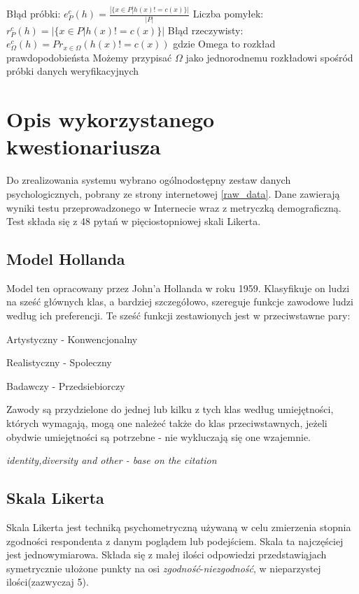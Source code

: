 \documentclass[12pt,a4paper,oneside]{report} %
\begin{document}
Błąd próbki:
$    e_P^c(h) = \frac{| \{ x \in P | h(x) != c(x) \} |}{|P|} $
Liczba pomyłek:
$        r_P^c(h) = | \{ x \in P | h(x) != c(x) \} | $
Błąd rzeczywisty:
$    e_\Omega^c (h) = Pr_{x \in \Omega}(h(x) != c(x))$ gdzie Omega to rozkład prawdopodobieństa
Możemy przypisać $\Omega$ jako jednorodnemu rozkładowi spośród próbki danych weryfikacyjnych
            
            





\chapter{Opis wykorzystanego kwestionariusza}

Do zrealizowania systemu wybrano ogólnodostępny zestaw danych psychologicznych, pobrany ze strony internetowej \ref{raw_data}. Dane zawierają wyniki testu przeprowadzonego w Internecie wraz z metryczką demograficzną. Test składa się z 48 pytań w pięciostopniowej skali Likerta.

\section{Model Hollanda}

Model ten opracowany przez John'a Hollanda w roku 1959. \cite{holland-source} Klasyfikuje on ludzi na sześć głównych klas, a bardziej szczegółowo, szereguje funkcje zawodowe ludzi według ich preferencji. Te sześć funkcji zestawionych jest w przeciwstawne pary:\par
Artystyczny - Konwencjonalny\par
Realistyczny - Spoleczny\par
Badawczy - Przedsiebiorczy\par
Zawody są przydzielone do jednej lub kilku z tych klas według umiejętności, których wymagają, mogą one należeć także do klas przeciwstawnych, jeżeli obydwie umiejętności są potrzebne - nie wykluczają się one wzajemnie.\par

\emph{identity,diversity and other - base on the citation}

\section{Skala Likerta}

Skala Likerta jest techniką psychometryczną używaną w celu zmierzenia stopnia zgodności respondenta z danym poglądem lub podejściem. Skala ta najczęściej jest jednowymiarowa. Składa się z małej ilości odpowiedzi przedstawiąjach symetrycznie ułożone punkty na osi \emph{zgodność}-\emph{niezgodność}, w nieparzystej ilości(zazwyczaj 5). \cite{bertram}
\end{document}

